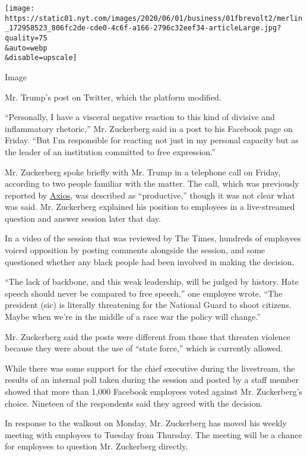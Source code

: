 \texttt{[image: https://static01.nyt.com/images/2020/06/01/business/01fbrevolt2/merlin\_172958523\_806fc2de-cde0-4c6f-a166-2796c32eef34-articleLarge.jpg?quality=75\\\&auto=webp\\\&disable=upscale]}

Image

Mr. Trump's post on Twitter, which the platform modified.

``Personally, I have a visceral negative reaction to this kind of
divisive and inflammatory rhetoric,'' Mr. Zuckerberg said in a post to
his Facebook page on Friday. ``But I'm responsible for reacting not just
in my personal capacity but as the leader of an institution committed to
free expression.''

Mr. Zuckerberg spoke briefly with Mr. Trump in a telephone call on
Friday, according to two people familiar with the matter. The call,
which was previously reported by
\href{https://www.axios.com/trump-facebook-zuckerberg-phone-call-d8d1016e-4e17-4906-b4f4-dc3e5c00bca7.html}{Axios},
was described as ``productive,'' though it was not clear what was said.
Mr. Zuckerberg explained his position to employees in a live-streamed
question and answer session later that day.

In a video of the session that was reviewed by The Times, hundreds of
employees voiced opposition by posting comments alongside the session,
and some questioned whether any black people had been involved in making
the decision.

``The lack of backbone, and this weak leadership, will be judged by
history. Hate speech should never be compared to free speech,'' one
employee wrote. ``The president (sic) is literally threatening for the
National Guard to shoot citizens. Maybe when we're in the middle of a
race war the policy will change.''

Mr. Zuckerberg said the posts were different from those that threaten
violence because they were about the use of ``state force,'' which is
currently allowed.

While there was some support for the chief executive during the
livestream, the results of an internal poll taken during the session and
posted by a staff member showed that more than 1,000 Facebook employees
voted against Mr. Zuckerberg's choice. Nineteen of the respondents said
they agreed with the decision.

In response to the walkout on Monday, Mr. Zuckerberg has moved his
weekly meeting with employees to Tuesday from Thursday. The meeting will
be a chance for employees to question Mr. Zuckerberg directly.

